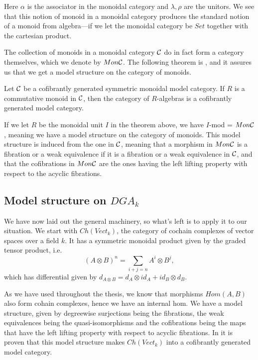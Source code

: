 Here $ \alpha$ is the associator in the monoidal category and $ \lambda, \rho$ are the unitors. We see that this notion of monoid in a monoidal category produces the standard notion of a monoid from algebra---if we let the monoidal category be $Set$ together with the cartesian product. 

The collection of monoids in a monoidal category $\mathcal{C}$ do in fact form a category themselves, which we denote by $Mon\mathcal{C}$. The following theorem is \cite[Theorem 4.1 (3)]{monoid}, and it assures us that we get a model structure on the category of monoids.

\begin{theorem}
Let $\mathcal{C}$ be a cofibrantly generated symmetric monoidal model category. If $R$ is a commutative monoid in $\mathcal{C}$, then the category of $R$-algebras is a cofibrantly generated model category. 
\end{theorem}

If we let $R$ be the monoidal unit $I$ in the theorem above, we have $I$-mod = $Mon\mathcal{C}$, meaning we have a model structure on the category of monoids. This model structure is induced from the one in $\mathcal{C}$, meaning that a morphism in $Mon\mathcal{C}$ is a fibration or a weak equivalence if it is a fibration or a weak equivalence in $\mathcal{C}$, and that the cofibrations in $Mon\mathcal{C}$ are the ones having the left lifting property with respect to the acyclic fibrations. 

\subsection*{Model structure on $DGA_k$}

We have now laid out the general machinery, so what's left is to apply it to our situation. We start with $Ch(Vect_k)$, the category of cochain complexes of vector spaces over a field $k$. It has a symmetric monoidal product given by the graded tensor product, i.e.
\begin{equation*}
    (A\otimes B)^n = \sum_{i+j=n} A^i \otimes B^j , 
\end{equation*}
which has differential given by $d_{A\otimes B} = d_A\otimes id_A + id_B\otimes d_B$. 

As we have used throughout the thesis, we know that morphisms $Hom(A, B)$ also form cohain complexes, hence we have an internal hom. We have a model structure, given by degreewise surjections being the fibrations, the weak equivalences being the quasi-isomorphisms and the cofibrations being the maps that have the left lifting property with respect to acyclic fibrations. In \cite[Theorem 2.3.11]{hovey} it is proven that this model structure makes $Ch(Vect_k)$ into a cofibrantly generated model category. 

